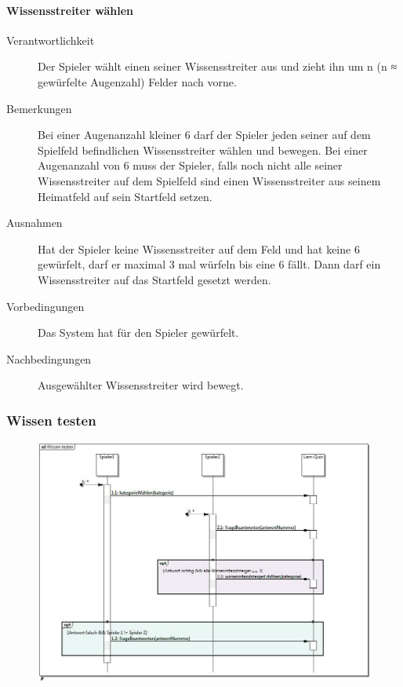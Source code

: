 \documentclass{report}
\begin{document}
\paragraph{Wissensstreiter wählen}
\begin{description}
	\item[Verantwortlichkeit] Der Spieler wählt einen seiner Wissensstreiter aus und zieht ihn um n (n ≈ gewürfelte Augenzahl) Felder nach vorne.
	\item[Bemerkungen] Bei einer Augenanzahl kleiner 6 darf der Spieler jeden seiner auf dem Spielfeld befindlichen Wissensstreiter wählen und bewegen. Bei einer Augenanzahl von 6 muss der Spieler, falls noch nicht alle seiner Wissensstreiter auf dem Spielfeld sind einen Wissensstreiter aus seinem Heimatfeld auf sein Startfeld setzen.
	\item[Ausnahmen] Hat der Spieler keine Wissensstreiter auf dem Feld und hat keine 6 gewürfelt, darf er maximal 3 mal würfeln bis eine 6 fällt. Dann darf ein Wissensstreiter auf das Startfeld gesetzt werden.
	\item[Vorbedingungen] Das System hat für den Spieler gewürfelt.
	\item[Nachbedingungen] Ausgewählter Wissensstreiter wird bewegt.
\end{description}



\subsubsection{Wissen testen}
\begin{figure}[H]
	\includegraphics[width=\textwidth]{Diagramme/SequenceDiagram-WissenTesten.jpg}
	\centering
\end{figure}
\end{document}
